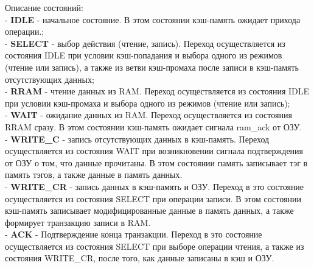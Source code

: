 \documentclass[13pt]{article}
\begin{document}
    Описание состояний:\\
    - \textbf{IDLE} - начальное состояние. В этом состоянии кэш-память ожидает прихода операции.;\\
    - \textbf{SELECT} - выбор действия (чтение, запись). Переход осуществляется из состояния IDLE при условии кэш-попадания и выбора одного из режимов (чтение или запись), а также из ветви кэш-промаха после записи в кэш-память отсутствующих данных;\\
    - \textbf{RRAM} - чтение данных из RAM. Переход осуществляется из состояния IDLE при условии кэш-промаха и выбора одного из режимов (чтение или запись);\\
    - \textbf{WAIT} - ожидание данных из RAM. Переход осуществляется из состояния RRAM сразу. В этом состоянии кэш-память ожидает сигнала ram\_ack от ОЗУ.\\
    - \textbf{WRITE\_C} - запись отсутствующих данных в кэш-память. Переход осуществляется из состояния WAIT при возникновении сигнала подтверждения от ОЗУ о том, что данные прочитаны. В этом состоянии память записывает тэг в память тэгов, а также данные в память данных.\\
    - \textbf{WRITE\_CR} - запись данных в кэш-память и ОЗУ. Переход в это состояние осуществляется из состояния SELECT при операции записи. В этом состоянии кэш-память записывает модифицированные данные в память данных, а также формирует транзакцию записи в RAM.\\
    - \textbf{ACK} - Подтверждение конца транзакции. Переход в это состояние осуществляется из состояния SELECT при выборе операции чтения, а также из состояния WRITE\_CR, после того, как данные записаны в кэш и ОЗУ.
    
\end{document}
